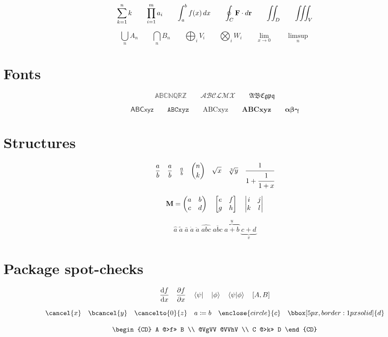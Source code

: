\[ \sum_{k=1}^{n} k \qquad \prod_{i=1}^{m} a_i \qquad \int_a^b f(x)\,dx \qquad \oint_C \mathbf{F} \cdot d\mathbf{r} \qquad \iint_D \qquad \iiint_V \]

\[ \bigcup_{n} A_n \qquad \bigcap_{n} B_n \qquad \bigoplus_{i} V_i \qquad \bigotimes_{i} W_i \qquad \lim_{x \to 0} \qquad \limsup_{n} \]

\section{Fonts}

\[ \mathbb{ABCNQRZ} \qquad \mathcal{ABCLMX} \qquad \mathfrak{ABCgpq} \]

\[ \mathsf{ABCxyz} \qquad \mathtt{ABCxyz} \qquad \mathrm{ABCxyz} \qquad \mathbf{ABCxyz} \qquad \boldsymbol{\alpha\beta\gamma} \]

\section{Structures}

\[ \frac{a}{b} \quad \dfrac{a}{b} \quad \tfrac{a}{b} \quad \binom{n}{k} \quad \sqrt{x} \quad \sqrt[3]{y} \quad \cfrac{1}{1 + \cfrac{1}{1 + x}} \]

\[
  \mathbf{M} = \begin{pmatrix} a & b \\ c & d \end{pmatrix}
  \quad
  \begin{bmatrix} e & f \\ g & h \end{bmatrix}
  \quad
  \begin{vmatrix} i & j \\ k & l \end{vmatrix}
\]

\[ \hat{a} \; \tilde{a} \; \bar{a} \; \dot{a} \; \ddot{a} \; \widehat{abc} \; \overline{abc} \; \overbrace{a+b}^{u} \; \underbrace{c+d}_{v} \]

\section{Package spot-checks}

\[ \dv{f}{x} \quad \pdv{f}{x} \quad \bra{\psi} \quad \ket{\phi} \quad \braket{\psi}{\phi} \quad \comm{A}{B} \]

\[ \cancel{x} \quad \bcancel{y} \quad \cancelto{0}{z} \quad a \coloneqq b \quad \enclose{circle}{c} \quad \bbox[5px, border: 1px solid]{d} \]

\[ \begin{CD} A @>f>> B \\ @VgVV @VVhV \\ C @>k>> D \end{CD} \]

